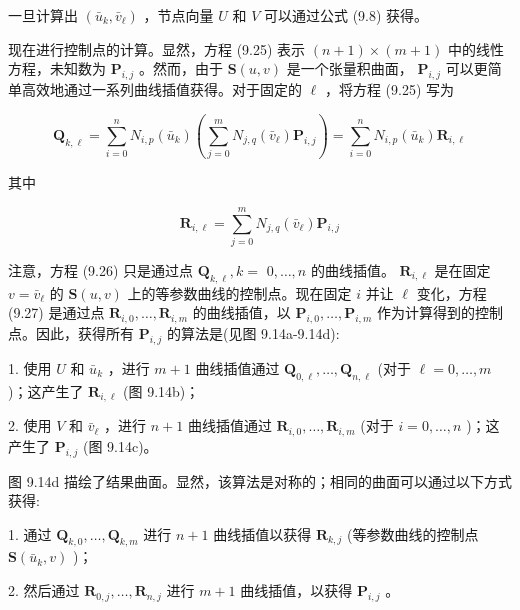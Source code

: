 \documentclass[../main.tex]{subfiles}
\begin{document}
一旦计算出 \(\left( {{\bar{u}}_{k},{\bar{v}}_{\ell }}\right)\) ，节点向量 \(U\) 和 \(V\) 可以通过公式 (9.8) 获得。

现在进行控制点的计算。显然，方程 (9.25) 表示 \(\left( {n + 1}\right)  \times  \left( {m + 1}\right)\) 中的线性方程，未知数为 \({\mathbf{P}}_{i,j}\) 。然而，由于 \(\mathbf{S}\left( {u,v}\right)\) 是一个张量积曲面， \({\mathbf{P}}_{i,j}\) 可以更简单高效地通过一系列曲线插值获得。对于固定的 \(\ell\) ，将方程 (9.25) 写为

\[
{\mathbf{Q}}_{k,\ell } = \mathop{\sum }\limits_{{i = 0}}^{n}{N}_{i,p}\left( {\bar{u}}_{k}\right) \left( {\mathop{\sum }\limits_{{j = 0}}^{m}{N}_{j,q}\left( {\bar{v}}_{\ell }\right) {\mathbf{P}}_{i,j}}\right)  = \mathop{\sum }\limits_{{i = 0}}^{n}{N}_{i,p}\left( {\bar{u}}_{k}\right) {\mathbf{R}}_{i,\ell } \tag{9.26}
\]

其中

\[
{\mathbf{R}}_{i,\ell } = \mathop{\sum }\limits_{{j = 0}}^{m}{N}_{j,q}\left( {\bar{v}}_{\ell }\right) {\mathbf{P}}_{i,j} \tag{9.27}
\]

注意，方程 (9.26) 只是通过点 \({\mathbf{Q}}_{k,\ell },k =\)  \(0,\ldots ,n\) 的曲线插值。 \({\mathbf{R}}_{i,\ell }\) 是在固定 \(v = {\bar{v}}_{\ell }\) 的 \(\mathbf{S}\left( {u,v}\right)\) 上的等参数曲线的控制点。现在固定 \(i\) 并让 \(\ell\) 变化，方程 (9.27) 是通过点 \({\mathbf{R}}_{i,0},\ldots ,{\mathbf{R}}_{i,m}\) 的曲线插值，以 \({\mathbf{P}}_{i,0},\ldots ,{\mathbf{P}}_{i,m}\) 作为计算得到的控制点。因此，获得所有 \({\mathbf{P}}_{i,j}\) 的算法是(见图 9.14a-9.14d):

1. 使用 \(U\) 和 \({\bar{u}}_{k}\) ，进行 \(m + 1\) 曲线插值通过 \({\mathbf{Q}}_{0,\ell },\ldots ,{\mathbf{Q}}_{n,\ell }\) (对于 \(\ell  = 0,\ldots ,m\) )；这产生了 \({\mathbf{R}}_{i,\ell }\) (图 9.14b)；

2. 使用 \(V\) 和 \({\bar{v}}_{\ell }\) ，进行 \(n + 1\) 曲线插值通过 \({\mathbf{R}}_{i,0},\ldots ,{\mathbf{R}}_{i,m}\) (对于 \(i = 0,\ldots ,n\) )；这产生了 \({\mathbf{P}}_{i,j}\) (图 9.14c)。

图 9.14d 描绘了结果曲面。显然，该算法是对称的；相同的曲面可以通过以下方式获得:

1. 通过 \({\mathbf{Q}}_{k,0},\ldots ,{\mathbf{Q}}_{k,m}\) 进行 \(n + 1\) 曲线插值以获得 \({\mathbf{R}}_{k,j}\) (等参数曲线的控制点 \(\mathbf{S}\left( {{\bar{u}}_{k},v}\right)\) )；

2. 然后通过 \({\mathbf{R}}_{0,j},\ldots ,{\mathbf{R}}_{n,j}\) 进行 \(m + 1\) 曲线插值，以获得 \({\mathbf{P}}_{i,j}\) 。 
\end{document}
